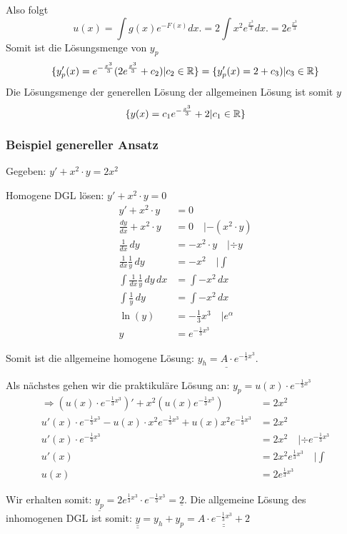Also folgt\[
u(x) = \int  g(x)e^{-F(x)} dx. =  2 \int  x^2e^{\frac{x^3}{3}} dx. = 2e^{\frac{x^3}{3}}
\]
Somit ist die Lösungsmenge von $y_p$
\[
\{ y_p'(x) = e^{-\frac{x^3}{3}} (2e^{\frac{x^3}{3}} + c_2) | c_2 \in \mathbb{R} \}
= \{ y_p'(x) =2 + c_3) | c_3 \in \mathbb{R} \}
\]
Die Lösungsmenge der generellen Lösung der allgemeinen Lösung ist somit $y$\[
\{ y(x) =  c_1e^{-\frac{x^3}{3}} +  2  | c_1 \in \mathbb{R} \}
\]

\subsubsection{Beispiel genereller Ansatz}
Gegeben: $y' + x^2 \cdot y = 2x^2$

Homogene DGL lösen: $y' + x^2 \cdot y = 0$
\begin{align*}
y' + x^2 \cdot y &= 0\\
\frac{dy}{dx} + x^2 \cdot y &= 0 \quad | -(x^2 \cdot y)\\
\frac{1}{dx}\, dy &= -x^2 \cdot y \quad | \div y\\
\frac{1}{dx} \frac{1}{y} \, dy &= -x^2 \quad | \int\\
\int \frac{1}{dx} \frac{1}{y} \, dy \, dx &= \int -x^2 \, dx\\
\int \frac{1}{y}\, dy &= \int -x^2 \, dx\\
\ln(y) &= -\frac{1}{3} x^3 \quad | e^\alpha\\
y &= e^{-\frac{1}{3}x^3}
\end{align*}

Somit ist die allgemeine homogene Lösung: $\underline{y_h = A \cdot e^{-\frac{1}{3}x^3}}$.


Als nächstes gehen wir die praktikuläre Lösung an:
$y_p = u(x) \cdot e^{-\frac{1}{3}x^3}$
\begin{align*}
\Rightarrow (u(x) \cdot e^{-\frac{1}{3}x^3})' + x^2 (u(x) e^{-\frac{1}{3}x^3}) &= 2 x^2\\
u'(x) \cdot e^{-\frac{1}{3}x^3} - u(x) \cdot x^2 e^{-\frac{1}{3}x^3} + u(x) x^2 e^{-\frac{1}{3}x^3} &= 2 x^2\\
u'(x) \cdot e^{-\frac{1}{3}x^3} &= 2 x^2 \quad | \div e^{-\frac{1}{3}x^3}\\
u'(x) &= 2 x^2 e^{\frac{1}{3}x^3} \quad | \int\\
u(x) &= 2 e^{\frac{1}{3}x^3}
\end{align*}

Wir erhalten somit: $\underline{y_p} = 2 e^{\frac{1}{3}x^3} \cdot e^{-\frac{1}{3}x^3} = \underline{2}$.
Die allgemeine Lösung des inhomogenen DGL ist somit:
$\underline{\underline{y}} = y_h + y_p = \underline{\underline{A \cdot e^{-\frac{1}{3}x^3} + 2}}$


